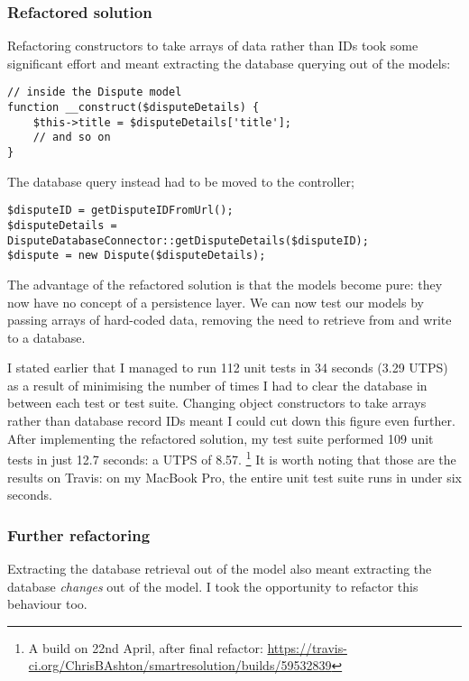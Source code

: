 \subsubsection{Refactored solution}

Refactoring constructors to take arrays of data rather than IDs took some significant effort and meant extracting the database querying out of the models:

\begin{lstlisting}
// inside the Dispute model
function __construct($disputeDetails) {
    $this->title = $disputeDetails['title'];
    // and so on
}
\end{lstlisting}

The database query instead had to be moved to the controller;

\begin{lstlisting}
$disputeID = getDisputeIDFromUrl();
$disputeDetails = DisputeDatabaseConnector::getDisputeDetails($disputeID);
$dispute = new Dispute($disputeDetails);
\end{lstlisting}

The advantage of the refactored solution is that the models become pure: they now have no concept of a persistence layer. We can now test our models by passing arrays of hard-coded data, removing the need to retrieve from and write to a database.

I stated earlier that I managed to run 112 unit tests in 34 seconds (3.29 UTPS) as a result of minimising the number of times I had to clear the database in between each test or test suite. Changing object constructors to take arrays rather than database record IDs meant I could cut down this figure even further. After implementing the refactored solution, my test suite performed 109 unit tests in just 12.7 seconds: a UTPS of 8.57. \footnote{A build on 22nd April, after final refactor: \url{https://travis-ci.org/ChrisBAshton/smartresolution/builds/59532839}} It is worth noting that those are the results on Travis: on my MacBook Pro, the entire unit test suite runs in under six seconds.

\subsubsection{Further refactoring}

Extracting the database retrieval out of the model also meant extracting the database \emph{changes} out of the model. I took the opportunity to refactor this behaviour too.

